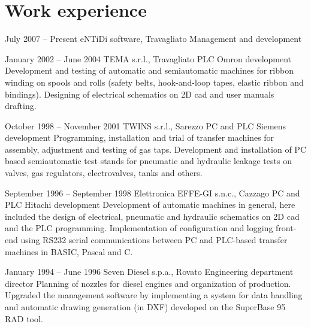 \documentclass{tccv}
\begin{document}
\section{Work experience}
\begin{eventlist}
\item{July 2007 -- Present}
        {eNTiDi software, Travagliato}
        {Management and development}

\item{January 2002 -- June 2004}
     {TEMA s.r.l., Travagliato}
     {PLC Omron development}
Development and testing of automatic and semiautomatic machines for
ribbon winding on spools and rolls (safety belts, hook-and-loop tapes,
elastic ribbon and bindings). Designing of electrical schematics on
2D cad and user manuals drafting.
\item{October 1998 -- November 2001}
     {TWINS s.r.l., Sarezzo}
     {PC and PLC Siemens development}
Programming, installation and trial of transfer machines for assembly,
adjustment and testing of gas taps. Development and installation of PC
based semiautomatic test stands for pneumatic and hydraulic leakage
tests on valves, gas regulators, electrovalves, tanks and others.
\item{September 1996 -- September 1998}
     {Elettronica EFFE-GI s.n.c., Cazzago}
     {PC and PLC Hitachi development}
Development of automatic machines in general, here included the design
of electrical, pneumatic and hydraulic schematics on 2D cad and the PLC
programming. Implementation of configuration and logging front-end using
RS232 serial communications between PC and PLC-based transfer machines
in BASIC, Pascal and C.
\item{January 1994 -- June 1996}
     {Seven Diesel s.p.a., Rovato}
     {Engineering department director}
Planning of nozzles for diesel engines and organization of production.
Upgraded the management software by implementing a system for data
handling and automatic drawing generation (in DXF) developed on the
SuperBase 95 RAD tool.
\end{eventlist}
\end{document}
